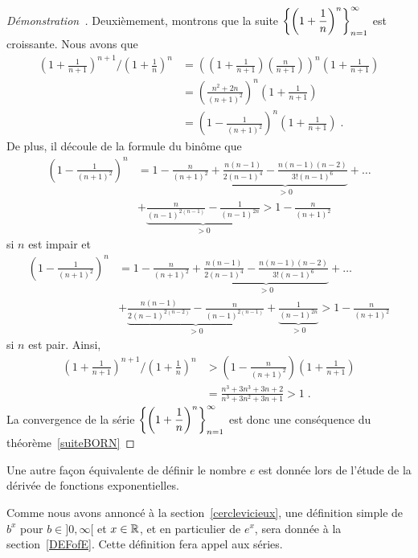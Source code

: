 {\begin{proof}[Démonstration\ \theory]
Deuxièmement, montrons que la suite
$\displaystyle \left\{\left(1+\frac{1}{n}\right)^n\right\}_{n=1}^\infty$
est croissante.  Nous avons que
\begin{align*}
\left(1+\frac{1}{n+1}\right)^{n+1}\bigg/
\left(1+\frac{1}{n}\right)^n
&= \left( \left(1+\frac{1}{n+1}\right)\left(\frac{n}{n+1}\right) \right)^n
\left(1+\frac{1}{n+1}\right) \\
&= \left( \frac{n^2+2n}{(n+1)^2} \right)^n
\left(1+\frac{1}{n+1}\right) \\
&= \left(1- \frac{1}{(n+1)^2} \right)^n \left(1+\frac{1}{n+1}\right) \; .
\end{align*}
De plus, il découle de la formule du binôme que
\begin{align*}
\left(1- \frac{1}{(n+1)^2} \right)^n &=
1 - \frac{n}{(n+1)^2} + \underbrace{\frac{n(n-1)}{2(n-1)^4} -
\frac{n(n-1)(n-2)}{3!(n-1)^6}}_{>0} + \ldots \\
& + \underbrace{\frac{n}{(n-1)^{2(n-1)}} - \frac{1}{(n-1)^{2n}}}_{>0}
> 1 - \frac{n}{(n+1)^2}
\end{align*}
si $n$ est impair et
\begin{align*}
\left(1- \frac{1}{(n+1)^2} \right)^n &=
1 - \frac{n}{(n+1)^2} + \underbrace{\frac{n(n-1)}{2(n-1)^4} -
\frac{n(n-1)(n-2)}{3!(n-1)^6}}_{>0} + \ldots \\
&+ \underbrace{\frac{n(n-1)}{2(n-1)^{2(n-2)}} -
\frac{n}{(n-1)^{2(n-1)}}}_{>0} + \underbrace{\frac{1}{(n-1)^{2n}}}_{>0}
> 1 - \frac{n}{(n+1)^2}
\end{align*}
si $n$ est pair.  Ainsi,
\begin{align*}
\left(1+\frac{1}{n+1}\right)^{n+1}\bigg/
\left(1+\frac{1}{n}\right)^n
&> \left(1 - \frac{n}{(n+1)^2}\right)\left(1+\frac{1}{n+1}\right) \\
&= \frac{n^3+3n^3+3n+2}{n^3+3n^2+3n+1}>1 \; .
\end{align*}
La convergence de la série
$\displaystyle \left\{\left(1+\frac{1}{n}\right)^n\right\}_{n=1}^\infty$
est donc une conséquence du théorème~\ref{suiteBORN}
\end{proof}

\begin{rmk}
Une autre façon équivalente de définir le nombre $e$ est donnée
lors de l'étude de la dérivée de fonctions exponentielles.
\end{rmk}

\begin{rmk}[\theory]
Comme nous avons annoncé à la section~\ref{cerclevicieux},
une définition simple de $b^x$ pour $b\in]0,\infty[$ et $x\in \mathbb{R}$, et
en particulier de $e^x$, sera donnée à la section~\ref{DEFofE}. 
Cette définition fera appel aux séries.
\end{rmk}

}

